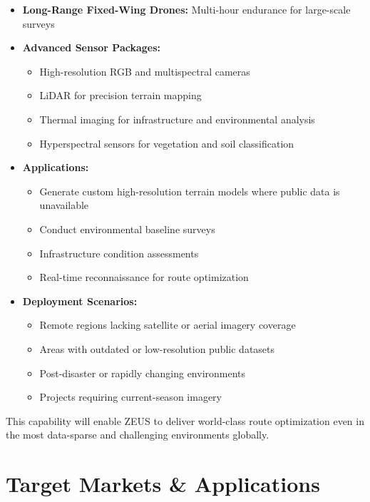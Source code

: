 \documentclass[11pt,letterpaper]{article}
\begin{document}
\begin{itemize}[leftmargin=*]
    \item \textbf{Long-Range Fixed-Wing Drones:} Multi-hour endurance for large-scale surveys
    \item \textbf{Advanced Sensor Packages:}
    \begin{itemize}
        \item High-resolution RGB and multispectral cameras
        \item LiDAR for precision terrain mapping
        \item Thermal imaging for infrastructure and environmental analysis
        \item Hyperspectral sensors for vegetation and soil classification
    \end{itemize}
    \item \textbf{Applications:}
    \begin{itemize}
        \item Generate custom high-resolution terrain models where public data is unavailable
        \item Conduct environmental baseline surveys
        \item Infrastructure condition assessments
        \item Real-time reconnaissance for route optimization
    \end{itemize}
    \item \textbf{Deployment Scenarios:}
    \begin{itemize}
        \item Remote regions lacking satellite or aerial imagery coverage
        \item Areas with outdated or low-resolution public datasets
        \item Post-disaster or rapidly changing environments
        \item Projects requiring current-season imagery
    \end{itemize}
\end{itemize}

This capability will enable ZEUS to deliver world-class route optimization even in the most data-sparse and challenging environments globally.

\newpage

\section{Target Markets \& Applications}
\end{document}
